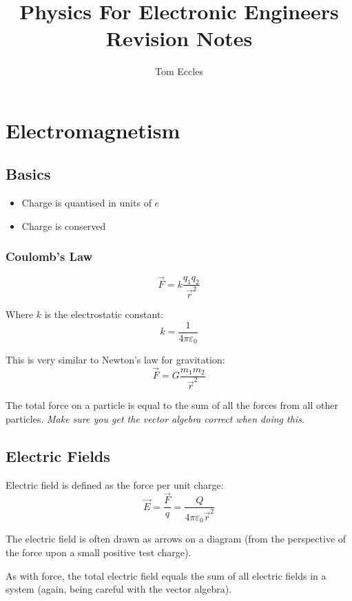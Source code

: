 \documentclass[11pt,a4paper]{report}
\title{Physics For Electronic Engineers Revision Notes}
\author{Tom Eccles}
\begin{document}
\maketitle
\pagebreak
\tableofcontents
\pagebreak
\chapter{Electromagnetism}
\section{Basics}
\begin{itemize}
\item Charge is quantised in units of $e$
\item Charge is conserved
\end{itemize}

\subsection{Coulomb's Law}
\begin{equation*}
	\vec{F} = k\frac{q_1q_2}{\vec{r}^2}
\end{equation*}

Where $k$ is the electrostatic constant:
\begin{equation*}
	k = \frac{1}{4\pi\varepsilon_0}
\end{equation*}

This is very similar to Newton's law for gravitation:
\begin{equation*}
	\vec{F}=G\frac{m_1m_2}{\vec{r}^2}
\end{equation*}

The total force on a particle is equal to the sum of all the forces from all other particles. \textit{Make sure you get the vector algebra correct when doing this.}

\section{Electric Fields}
Electric field is defined as the force per unit charge:
\begin{equation*}
	\vec{E} = \frac{\vec{F}}{q} = \frac{Q}{4\pi\varepsilon_0 \vec{r}^2}
\end{equation*}

The electric field is often drawn as arrows on a diagram (from the perspective of the force upon a small positive test charge).

As with force, the total electric field equals the sum of all electric fields in a system (again, being careful with the vector algebra).
\end{document}
